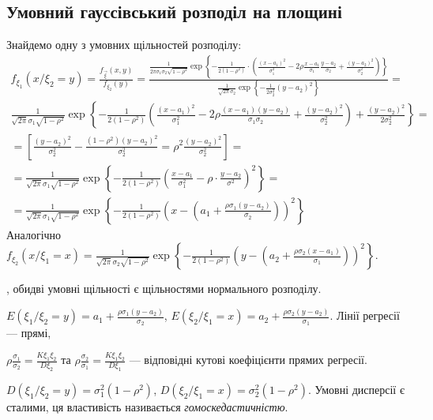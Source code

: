\subsection{Умовний гауссівський розподіл на площині}
Знайдемо одну з умовних щільностей розподілу:
\begin{gather*}
    f_{\xi_1}(x/\xi_2 = y) = \frac{f_{\vec{\xi}}(x,y)}{f_{\xi_2}(y)} = 
    \frac{\frac{1}{2\pi\sigma_1\sigma_2\sqrt{1-\rho^2}} \exp\left\{
        -\frac{1}{2(1-\rho^2)}\cdot
        \left(\frac{(x-a_1)^2}{\sigma_1^2} -
        2\rho\frac{x-a_1}{\sigma_1}\frac{y-a_2}{\sigma_2} +
        \frac{(y-a_2)^2}{\sigma_2^2}
        \right)\right\} }{
            \frac{1}{\sqrt{2\pi}\sigma_2} \exp\left\{-\frac{1}{2\sigma_2^2}(y-a_2)^2\right\}
        } = \\
        \frac{1}{\sqrt{2\pi}\sigma_1\sqrt{1-\rho^2}} \exp\left\{
            -\frac{1}{2(1-\rho^2)}
        \left(\frac{(x-a_1)^2}{\sigma_1^2} -
        2\rho\frac{(x-a_1)(y-a_2)}{\sigma_1\sigma_2} +
        \frac{(y-a_2)^2}{\sigma_2^2}
        \right) +
        \frac{(y-a_2)^2}{2\sigma_2^2}
        \right\} = \\
        = \left [ \frac{(y-a_2)^2}{\sigma_2^2} - \frac{(1-\rho^2)(y-a_2)^2}{\sigma_2^2} = \rho^2 \frac{(y-a_2)^2}{\sigma_2^2}\right]=\\
        = \frac{1}{\sqrt{2\pi}\sigma_1\sqrt{1-\rho^2}} \exp\left\{-\frac{1}{2(1-\rho^2)}\left( \frac{x-a_1}{\sigma_1^2} - \rho\cdot\frac{y-a_2}{\sigma^2}\right)^2\right\} = \\
        = \frac{1}{\sqrt{2\pi}\sigma_1\sqrt{1-\rho^2}} \exp\left\{-\frac{1}{2(1-\rho^2)}\left( x- \left( a_1 + \frac{\rho\sigma_1(y-a_2)}{\sigma_2}\right)\right)^2\right\}
\end{gather*}
Аналогічно $f_{\xi_2}(x/\xi_1 = x) = \frac{1}{\sqrt{2\pi}\sigma_2\sqrt{1-\rho^2}} \exp\left\{-\frac{1}{2(1-\rho^2)}\left( y- \left( a_2 + \frac{\rho\sigma_2(x-a_1)}{\sigma_1}\right)\right)^2\right\}$.

, обидві умовні щільності є щільностями нормального розподілу.

$E\left( \xi_1 / \xi_2 = y\right) = a_1 + \frac{\rho\sigma_1(y-a_2)}{\sigma_2}$, 
$E\left( \xi_2 / \xi_1 = x\right) = a_2 + \frac{\rho\sigma_2(y-a_2)}{\sigma_1}$. Лінії регресії --- прямі,

\noindent
$\rho\frac{\sigma_1}{\sigma_2} = \frac{K\xi_1\xi_2}{D\xi_2}$ та $\rho\frac{\sigma_2}{\sigma_1}  = \frac{K\xi_1\xi_2}{D\xi_1}$ --- відповідні кутові коефіцієнти прямих регресії.

$D\left( \xi_1 / \xi_2 = y\right) = \sigma_1^2(1-\rho^2)$, 
$D\left( \xi_2 / \xi_1 = x\right) = \sigma_2^2(1-\rho^2)$. Умовні дисперсії є сталими, ця властивість називається \emph{гомоскедастичністю}.
